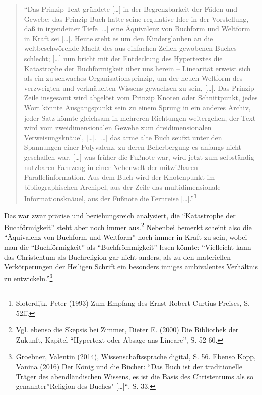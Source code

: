 \documentclass[a4paper,
fontsize=11pt,
oneside,
numbers=noperiodatend,
parskip=half-,
bibliography=totoc,
final
]{scrartcl}
\begin{document}
\begin{quote}
\enquote{Das Prinzip Text gründete {[}\ldots{}{]} in der Begrenzbarkeit
der Fäden und Gewebe; das Prinzip Buch hatte seine regulative Idee in
der Vorstellung, daß in irgendeiner Tiefe {[}\ldots{}{]} eine Äquivalenz
von Buchform und Weltform in Kraft sei {[}\ldots{}{]}. Heute steht es um
den Kinderglauben an die weltbeschwörende Macht des aus einfachen Zeilen
gewobenen Buches schlecht; {[}\ldots{}{]} nun bricht mit der Entdeckung
des Hypertextes die Katastrophe der Buchförmigkeit über uns herein --
Linearität erweist sich als ein zu schwaches Organisationsprinzip, um
der neuen Weltform des verzweigten und verknäuelten Wissens gewachsen zu
sein, {[}\ldots{}{]}. Das Prinzip Zeile insgesamt wird abgelöst vom
Prinzip Knoten oder Schnittpunkt, jedes Wort könnte Ausgangspunkt sein
zu einem Sprung in ein anderes Archiv, jeder Satz könnte gleichsam in
mehreren Richtungen weitergehen, der Text wird vom zweidimensionalen
Gewebe zum dreidimensionalen Verweisungsknäuel, {[}\ldots{}{]}.
{[}\ldots{}{]} das arme alte Buch seufzt unter den Spannungen einer
Polyvalenz, zu deren Beherbergung es anfangs nicht geschaffen war.
{[}\ldots{}{]} was früher die Fußnote war, wird jetzt zum selbständig
nutzbaren Fahrzeug in einer Nebenwelt der mitwißbaren
Parallelinformation. Aus dem Buch wird der Knotenpunkt im
bibliographischen Archipel, aus der Zeile das multidimensionale
Informationsknäuel, aus der Fußnote die Fernreise
{[}\ldots{}{]}.}\footnote{Sloterdijk, Peter (1993) Zum Empfang des
  Ernst-Robert-Curtius-Preises, S. 52ff.}
\end{quote}

Das war zwar präzise und beziehungsreich analysiert, die
\enquote{Katastrophe der Buchförmigkeit} steht aber noch immer
aus.\footnote{Vgl. ebenso die Skepsis bei Zimmer, Dieter E. (2000) Die
  Bibliothek der Zukunft, Kapitel \enquote{Hypertext oder Absage ans
  Lineare}, S. 52-60.} Nebenbei bemerkt scheint also die
\enquote{Äquivalenz von Buchform und Weltform} noch immer in Kraft zu
sein, wobei man die \enquote{Buchförmigkeit} als
\enquote{Buchfrömmigkeit} lesen könnte: \enquote{Vielleicht kann das
Christentum als Buchreligion gar nicht anders, als zu den materiellen
Verkörperungen der Heiligen Schrift ein besonders inniges ambivalentes
Verhältnis zu entwickeln.}\footnote{Groebner, Valentin (2014),
  Wissenschaftssprache digital, S. 56. Ebenso Kopp, Vanina (2016) Der
  König und die Bücher: \enquote{Das Buch ist der traditionelle Träger
  des abendländischen Wissens, es ist die Basis des Christentums als so
  genannter}Religion des Buches" {[}\ldots{}{]}``, S. 33.}
\end{document}
